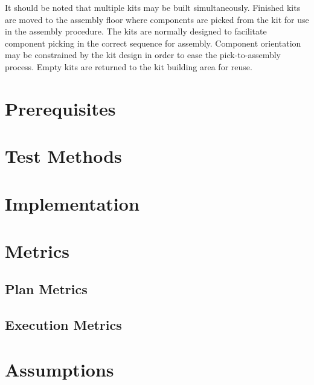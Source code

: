 It should be noted that multiple kits may be built simultaneously.
Finished kits are moved to the assembly floor where components
are picked from the kit for use in the assembly procedure.
The kits are normally designed to facilitate component picking in the correct
sequence for assembly. Component orientation may be constrained
by the kit design in order to ease the pick-to-assembly process.
Empty kits are returned to the kit building area for reuse.

\renewcommand{\topfraction}{1.0}
\setcounter{topnumber}{100}

\section{Prerequisites}
\label{sect:Prerequisites}


\section{Test Methods}
\label{sect:TestMethods}


\section{Implementation}
\label{sect:Implementation}


\section{Metrics}
\subsection{Plan Metrics}
\label{sect:PlanMetrics}

\subsection{Execution Metrics}
\label{sect:ExecutionMetrics}





\section{Assumptions}
\label{sect:Assumptions}


